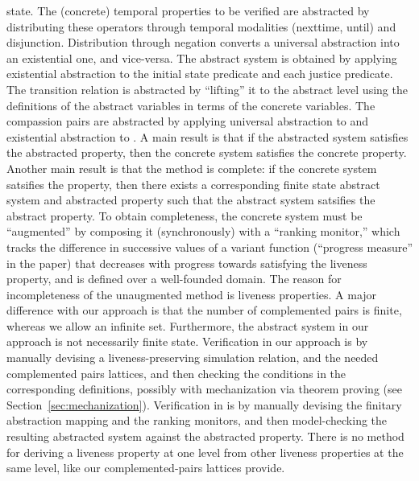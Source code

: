 \documentclass[11pt]{article}
\begin{document}
state.
The (concrete) temporal properties to be verified are abstracted
by distributing these operators through temporal modalities (nexttime,
until) and disjunction. Distribution through negation converts a 
universal abstraction into an existential one, and vice-versa.
The abstract system is obtained by applying existential abstraction to
the initial state predicate and each justice predicate. The transition 
relation is abstracted by ``lifting'' it to the abstract level using
the definitions of the abstract variables in terms of the concrete
variables.
The compassion pairs \mbox{} are abstracted by applying
universal abstraction to  and existential abstraction to .
A main result is that if the abstracted system satisfies the
abstracted property, then the concrete system satisfies the concrete
property.  Another main result is that the method is complete: if the
concrete system satsifies the property, then there exists a
corresponding finite state abstract system and abstracted property
such that the abstract system satsifies the abstract property.  To
obtain completeness, the concrete system must be ``augmented'' by
composing it (synchronously) with a ``ranking monitor,'' which tracks
the difference in successive values of a variant function (``progress
measure'' in the paper) that decreases with progress towards
satisfying the liveness property, and is defined over a well-founded
domain. The reason for incompleteness of the unaugmented method is
liveness properties.
A major difference with our approach is that the number of
complemented pairs is finite, whereas we allow an infinite set.
Furthermore, the abstract system in our approach is not necessarily
finite state. Verification in our approach is by manually devising a
liveness-preserving simulation relation, and the needed complemented
pairs lattices, and then checking the conditions in the corresponding
definitions, possibly with mechanization via theorem proving (see
Section~\ref{sec:mechanization}).  Verification in \cite{KP00,KPV01}
is by manually devising the finitary abstraction mapping and the
ranking monitors, and then model-checking the resulting abstracted
system against the abstracted property. There is no method for
deriving a liveness property at one level from other liveness
properties at the same level, like our complemented-pairs lattices
provide.
\end{document}
